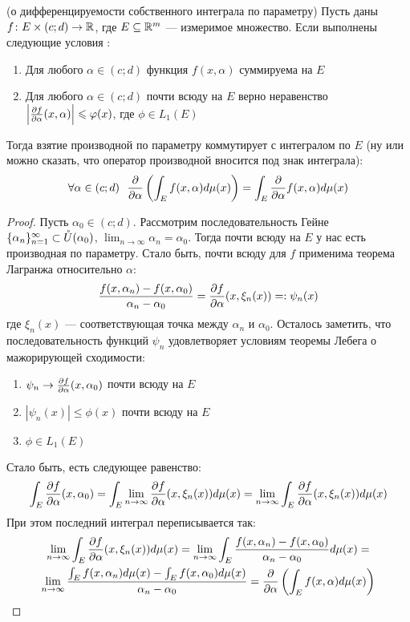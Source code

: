 \begin{theorem} (о дифференцируемости собственного интеграла по параметру)
	Пусть даны $f \colon E \times (c; d) \to \mathbb{R}$, где $E \subseteq \mathbb{R}^m$ --- измеримое множество. Если выполнены следующие условия :
	\begin{enumerate}
		\item Для любого $\alpha \in (c; d)$ функция $f(x, \alpha)$ суммируема на $E$
		
		\item Для любого $\alpha \in (c; d)$ почти всюду на $E$ верно неравенство $\left|\frac{\partial f}{\partial \alpha}(x, \alpha)\right| \leqslant \varphi(x)$, где $\phi \in L_1(E)$
	\end{enumerate}
	Тогда взятие производной по параметру коммутирует с интегралом по $E$ (ну или можно сказать, что оператор производной вносится под знак интеграла):
	\[
		\forall \alpha \in (c; d)\ \ \pd{}{\alpha} \ps{\int_E f(x, \alpha)d\mu(x)} = \int_E \pd{}{\alpha}f(x, \alpha)d\mu(x)
	\]
\end{theorem}

\begin{proof}
	Пусть $\alpha_0 \in (c; d)$. Рассмотрим последовательность Гейне $\{\alpha_n\}_{n = 1}^\infty \subset \mathring{U}(\alpha_0)$, $\lim_{n \to \infty} \alpha_n = \alpha_0$. Тогда почти всюду на $E$ у нас есть производная по параметру. Стало быть, почти всюду для $f$ применима теорема Лагранжа относительно $\alpha$:
	\[
		\frac{f(x, \alpha_n) - f(x, \alpha_0)}{\alpha_n - \alpha_0} = \frac{\partial f}{\partial \alpha}(x, \xi_n(x)) =: \psi_n(x)
	\]
	где $\xi_n(x)$ --- соответствующая точка между $\alpha_n$ и $\alpha_0$. Осталось заметить, что последовательность функций $\psi_n$ удовлетворяет условиям теоремы Лебега о мажорирующей сходимости:
	\begin{enumerate}
		\item $\psi_n \to \frac{\partial f}{\partial \alpha}(x, \alpha_0)$ почти всюду на $E$
		
		\item $|\psi_n(x)| \le \phi(x)$ почти всюду на $E$
		
		\item $\phi \in L_1(E)$
	\end{enumerate}
	Стало быть, есть следующее равенство:
	\[
		\int_E \frac{\partial f}{\partial \alpha}(x, \alpha_0) = \int_E \lim_{n \to \infty} \frac{\partial f}{\partial \alpha}(x, \xi_n(x))d\mu(x) = \lim_{n \to \infty} \int_E \frac{\partial f}{\partial \alpha}(x, \xi_n(x))d\mu(x)
	\]
	При этом последний интеграл переписывается так:
	\begin{multline*}
		\lim_{n \to \infty} \int_E \frac{\partial f}{\partial \alpha}(x, \xi_n(x))d\mu(x) = \lim_{n \to \infty} \int_E \frac{f(x, \alpha_n) - f(x, \alpha_0)}{\alpha_n - \alpha_0}d\mu(x) =
		\\
		\lim_{n \to \infty} \frac{\int_E f(x, \alpha_n)d\mu(x) - \int_E f(x, \alpha_0)d\mu(x)}{\alpha_n - \alpha_0} = \frac{\partial }{\partial \alpha} \left(\int_E f(x, \alpha)d\mu(x)\right)
	\end{multline*}
\end{proof}

